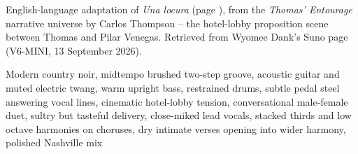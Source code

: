 
\label{sec:little-trouble-tonight}
\begin{notes}
English-language adaptation of \emph{Una locura} (page \pageref{sec:una-locura}), from the \emph{Thomas' Entourage} narrative universe by Carlos Thompson -- the hotel-lobby proposition scene between Thomas and Pilar Venegas. Retrieved from Wyomee Dank's Suno page (V6-MINI, 13 September 2026).
\end{notes}
\begin{style}
Modern country noir, midtempo brushed two-step groove, acoustic guitar and muted electric twang, warm upright bass, restrained drums, subtle pedal steel answering vocal lines, cinematic hotel-lobby tension, conversational male-female duet, sultry but tasteful delivery, close-miked lead vocals, stacked thirds and low octave harmonies on choruses, dry intimate verses opening into wider harmony, polished Nashville mix
\end{style}
